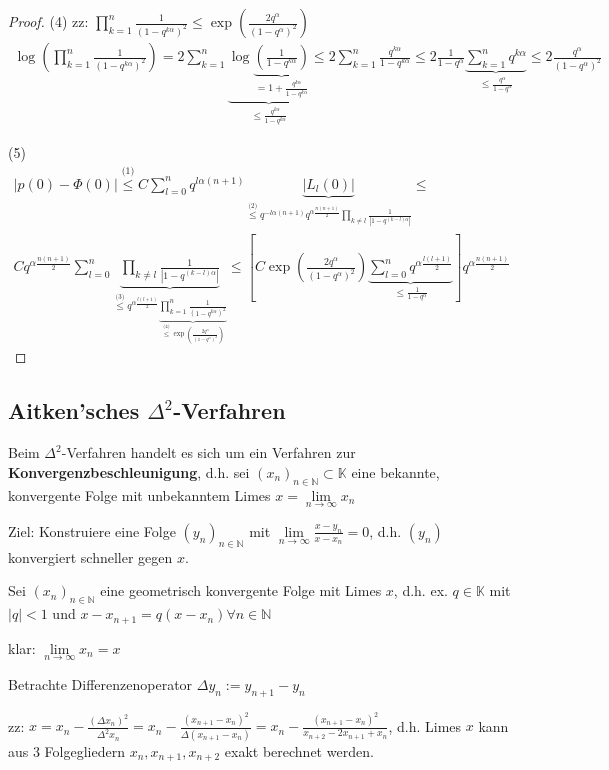 \begin{proof}
	(4) zz: $\prod_{k=1}^{n} \frac{1}{(1-q^{k\alpha})^2} \leq \exp\left(\frac{2q^\alpha}{(1-q^\alpha)^2}\right)$
	\begin{align*}
		\log\left(\prod_{k=1}^{n} \frac{1}{(1-q^{k\alpha})^2}\right) = 2 \sum_{k=1}^{n} \underbrace{\log\underbrace{\left(\frac{1}{1-q^{k\alpha}}\right)}_{= 1 + \frac{q^{k\alpha}}{1-q^{k\alpha}}}}_{\leq \frac{q^{k\alpha}}{1-q^{k\alpha}}} \leq
		2 \sum_{k=1}^{n} \frac{q^{k\alpha}}{1-q^{k\alpha}} \leq
		2 \frac{1}{1-q^\alpha} \underbrace{\sum_{k=1}^{n} q^{k\alpha}}_{\leq \frac{q^\alpha}{1-q^\alpha}} \leq
		2 \frac{q^\alpha}{(1-q^\alpha)^2}
	\end{align*}
	
	(5) \begin{align*}
		|p(0) - \Phi(0)| \overset{\text{(1)}}{\leq} C \sum_{l=0}^{n} q^{l\alpha(n+1)} \underbrace{|L_l(0)|}_{\overset{\text{(2)}}{\leq} q^{-l\alpha(n+1)} q^{\alpha \frac{n(n+1)}{2}} \prod_{k\neq l} \frac{1}{|1-q^{(k-l)\alpha}|}} \leq\\
		C q^{\alpha \frac{n(n+1)}{2}} \sum_{l=0}^{n} \underbrace{\prod_{k\neq l} \frac{1}{|1-q^{(k-l)\alpha}|}}_{\overset{\text{(3)}}{\leq} q^{\alpha \frac{l(l+1)}{2}} \underbrace{\prod_{k=1}^{n} \frac{1}{(1-q^{k\alpha})^2}}_{\overset{\text{(4)}}{\leq} \exp\left(\frac{2q^\alpha}{(1-q^\alpha)^2}\right)  }} \leq
		\left[C \exp\left(\frac{2q^\alpha}{(1-q^{\alpha})^2}\right) \underbrace{\sum_{l=0}^{n} q^{\alpha \frac{l(l+1)}{2}}}_{\leq \frac{1}{1-q^\alpha}} \right] q^{\alpha \frac{n(n+1)}{2}}
	\end{align*}
\end{proof}

\subsection{Aitken'sches $\Delta^2$-Verfahren}

Beim $\Delta^2$-Verfahren handelt es sich um ein Verfahren zur \textbf{Konvergenzbeschleunigung}, d.h. sei $(x_n)_{n \in \mathbb{N}} \subset \mathbb{K}$ eine bekannte, konvergente Folge mit unbekanntem Limes $x = \lim\limits_{n\rightarrow\infty} x_n$

Ziel: Konstruiere eine Folge $(y_n)_{n\in \mathbb{N}}$ mit $\lim\limits_{n\rightarrow\infty} \frac{x-y_n}{x-x_n} = 0$, d.h. $(y_n)$ konvergiert schneller gegen $x$.

\begin{remark}
	Sei $(x_n)_{n\in \mathbb{N}}$ eine geometrisch konvergente Folge mit Limes $x$, d.h. ex. $q \in \mathbb{K}$ mit $|q| < 1$ und $x-x_{n+1} = q(x-x_n) \forall n \in \mathbb{N}$
	
	klar: $\lim\limits_{n\rightarrow\infty} x_n = x$
	
	Betrachte Differenzenoperator $\Delta y_n := y_{n+1} - y_n$
	
	zz: $x = x_n - \frac{(\Delta x_n)^2}{\Delta^2x_n} = x_n - \frac{(x_{n+1} - x_n)^2}{\Delta(x_{n+1} - x_n)} = x_n - \frac{(x_{n+1} - x_n)^2}{x_{n+2} - 2x_{n+1} + x_n}$, d.h. Limes $x$ kann aus 3 Folgegliedern $x_n, x_{n+1}, x_{n+2}$ exakt berechnet werden.
\end{remark}

